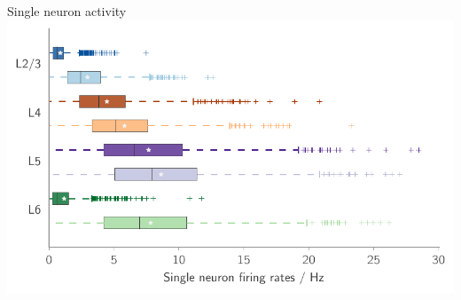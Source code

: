 \documentclass[xcolor=x11names,compress]{beamer}
\renewcommand{\(}{\begin{columns}}
\renewcommand{\)}{\end{columns}}
\newcommand{\<}[1]{\begin{column}{#1}}
\renewcommand{\>}{\end{column}}
\begin{document}
\begin{frame}[t]{Single neuron activity}
        \includegraphics[height=0.8\textheight]{../figures/single_neuron_activity_rates} 
\end{frame}
\end{document}
